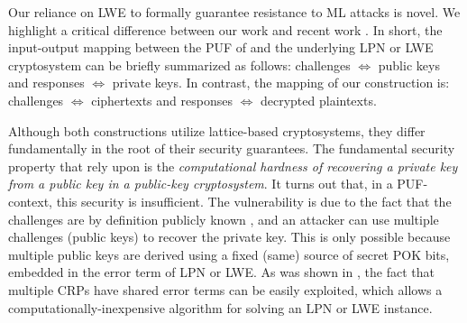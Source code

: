 Our reliance on LWE to formally guarantee resistance to ML attacks is novel. 
We highlight a critical difference between our work and recent work  \cite{fuller2013computational,herder2017trapdoor,jin2017fpga}.
In short, the input-output mapping between the PUF of \cite{fuller2013computational,herder2017trapdoor,jin2017fpga} and the underlying LPN or LWE cryptosystem can be briefly summarized as follows: 
 challenges $\Longleftrightarrow$ public keys and responses $\Longleftrightarrow$  private keys. In contrast, the mapping of our construction is: challenges $\Longleftrightarrow$ ciphertexts and responses $\Longleftrightarrow$ decrypted plaintexts.

Although both constructions utilize lattice-based cryptosystems, they differ fundamentally in the root of their security guarantees.
The fundamental security property that \cite{fuller2013computational,herder2017trapdoor,jin2017fpga} rely upon is the \emph{computational hardness of recovering a private key from a public key in a public-key cryptosystem}. 
It turns out that, in a PUF-context, this security is insufficient. The vulnerability is due to the fact that the challenges are by definition publicly known \cite{fuller2013computational,herder2017trapdoor,jin2017fpga}, and an attacker can use multiple challenges (public keys) to recover the private key. This is only possible because multiple public keys are derived using a fixed (same) source of secret POK bits, embedded in the error term of LPN or LWE. As was shown in \cite{apon2017efficient}, the fact that multiple CRPs have shared error terms can be easily exploited, which allows a computationally-inexpensive algorithm for solving an LPN or LWE instance. %

